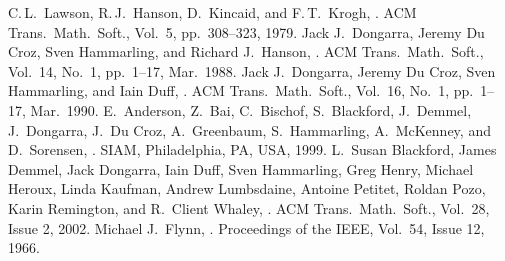 \begin{thebibliography}{99}
  C.\,L.\ Lawson, R.\,J.\ Hanson, D.\ Kincaid, and F.\,T.\ Krogh,
  .
  ACM Trans.\ Math.\ Soft., Vol.\ 5, pp.\ 308--323, 1979.
  Jack J.\ Dongarra, Jeremy Du Croz, Sven Hammarling, and Richard J.\ Hanson,
  .
  ACM Trans.\ Math.\ Soft., Vol.\ 14, No.\ 1, pp.\ 1--17, Mar.\ 1988.
  Jack J.\ Dongarra, Jeremy Du Croz, Sven Hammarling, and Iain Duff,
  .
  ACM Trans.\ Math.\ Soft., Vol.\ 16, No.\ 1, pp.\ 1--17, Mar.\ 1990.
  E.\ Anderson, Z.\ Bai, C.\ Bischof, S.\ Blackford, J.\ Demmel, J.\ Dongarra,
  J.\ Du Croz, A.\ Greenbaum, S.\ Hammarling, A.\ McKenney, and D.\ Sorensen,
  .
  SIAM, Philadelphia, PA, USA, 1999.
  L.\ Susan Blackford, James Demmel, Jack Dongarra, Iain Duff, Sven Hammarling,
  Greg Henry, Michael Heroux, Linda Kaufman, Andrew Lumbsdaine, Antoine Petitet,
  Roldan Pozo, Karin Remington, and R.\ Client Whaley,
  .
  ACM Trans.\ Math.\ Soft., Vol.\ 28, Issue 2, 2002.
  Michael J.\ Flynn,
  .
  Proceedings of the IEEE, Vol.\ 54, Issue 12, 1966.
\end{thebibliography}

\let\realglossitem\glossitem
\renewcommand{\glossitem}[4]{\hangpara{4em}{1}\realglossitem{#1}{#2}{#3}{#4}}

\clearpage
\renewcommand{\glossaryname}{Cross-references}
\renewcommand{\preglossaryhook}{Each clause and subclause label is listed below along with the
corresponding clause or subclause number and page number, in alphabetical order by label.\\}
\twocolglossary
\renewcommand{\leftmark}{\glossaryname}
{
\raggedright
\printglossary[xrefindex]
}

\clearpage

\renewcommand{\glossaryname}{Cross-references from ISO \CppXVII{}}
\renewcommand{\preglossaryhook}{All clause and subclause labels from
ISO \CppXVII{} (ISO/IEC 14882:2017, \doccite{Programming Languages --- \Cpp{}})
are present in this document, with the exceptions described below.\\}
\renewcommand{\leftmark}{\glossaryname}
{
\raggedright
\printglossary[xrefdelta]
}

